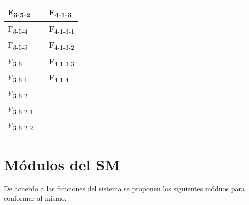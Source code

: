 \begin{center}
\begin{tabular}{ | m{2cm} | m{2cm} | m{2cm} | }
 \hline
 F\textsubscript{3-5-2} &  &  F\textsubscript{4-1-3} \\
 \hline
 F\textsubscript{3-5-4} &  &  F\textsubscript{4-1-3-1} \\
 \hline
 F\textsubscript{3-5-5} &  &  F\textsubscript{4-1-3-2} \\
 \hline
 F\textsubscript{3-6} &  &  F\textsubscript{4-1-3-3} \\
 \hline
 F\textsubscript{3-6-1} &  & F\textsubscript{4-1-4} \\
 \hline
 F\textsubscript{3-6-2} &  &  \\
 \hline
 F\textsubscript{3-6-2-1} &  &  \\
 \hline
 F\textsubscript{3-6-2-2} &  &  \\
 
 
\hline
\end{tabular}
\end{center}


%
\section{M\'odulos del SM}
%
De acuerdo a las funciones del sistema se proponen los siguientes m\'oduos para conformar al mismo.

